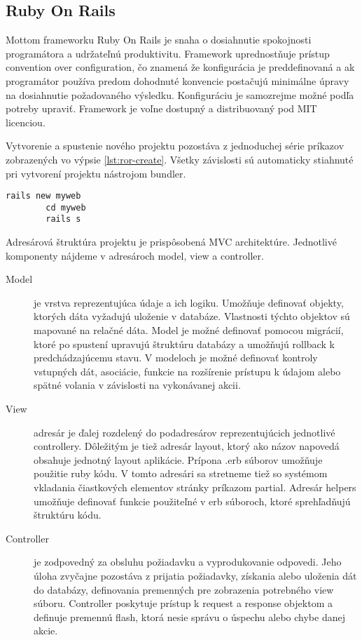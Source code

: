	\subsection{Ruby On Rails}
	Mottom frameworku Ruby On Rails je snaha o dosiahnutie spokojnosti programátora a udržateľnú produktivitu. Framework uprednostňuje prístup convention over configuration, čo znamená že konfigurácia je preddefinovaná a ak programátor používa predom dohodnuté konvencie postačujú minimálne úpravy na dosiahnutie požadovaného výsledku. Konfiguráciu je samozrejme možné podľa potreby upraviť. Framework je voľne dostupný a distribuovaný pod MIT licenciou.
	
	Vytvorenie a spustenie nového projektu pozostáva z jednoduchej série príkazov zobrazených vo výpsie \ref{lst:ror-create}. Všetky závislosti sú automaticky stiahnuté pri vytvorení projektu nástrojom bundler.
	\begin{lstlisting}[label=lst:ror-create,caption=Príklad vytvorenia a spustenia projektu v Ruby On Rails]
		rails new myweb
		cd myweb
		rails s
	\end{lstlisting}

	Adresárová štruktúra projektu je prispôsobená MVC architektúre. Jednotlivé komponenty nájdeme v adresároch model, view a controller.
	\begin{description}
		\item[Model] je vrstva reprezentujúca údaje a ich logiku. Umožňuje definovať objekty, ktorých dáta vyžadujú uloženie v databáze. Vlastnosti týchto objektov sú mapované na relačné dáta. Model je možné definovať pomocou migrácií, ktoré po spustení upravujú štruktúru databázy a umožňujú rollback k predchádzajúcemu stavu. V modeloch je možné definovať kontroly vstupných dát, asociácie, funkcie na rozšírenie prístupu k údajom alebo spätné volania v závislosti na vykonávanej akcii.
		\item[View] adresár je ďalej rozdelený do podadresárov reprezentujúcich jednotlivé controllery. Dôležitým je tiež adresár layout, ktorý ako názov napovedá obsahuje jednotný layout aplikácie. Prípona .erb súborov umožňuje použitie ruby kódu. V tomto adresári sa stretneme tiež so systémom vkladania čiastkových elementov stránky príkazom partial. Adresár helpers umožňuje definovať funkcie použiteľné v erb súboroch, ktoré sprehľadňujú štruktúru kódu.
		\item[Controller] je zodpovedný za obsluhu požiadavku a vyprodukovanie odpovedi. Jeho úloha zvyčajne pozostáva z prijatia požiadavky, získania alebo uloženia dát do databázy, definovania premenných pre zobrazenia potrebného view súboru. Controller poskytuje prístup k request a response objektom a definuje premennú flash, ktorá nesie správu o úspechu alebo chybe danej akcie.
	\end{description}
	
